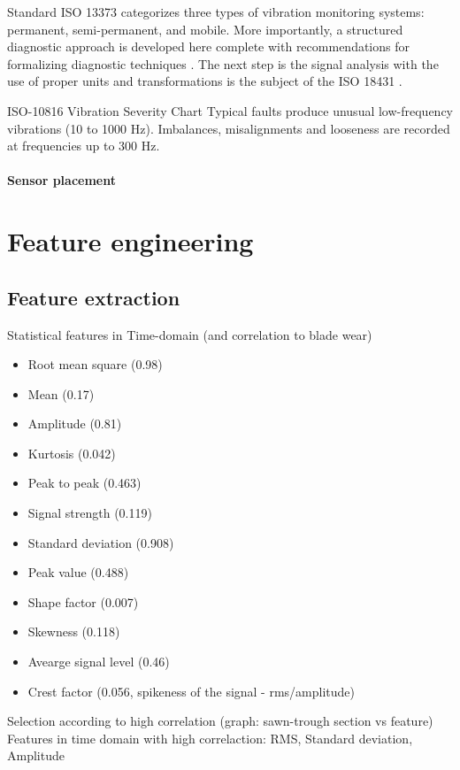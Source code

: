 Standard ISO 13373 categorizes three types of vibration monitoring systems: permanent, semi-permanent, and mobile. More importantly, a structured diagnostic approach is developed here complete with recommendations for formalizing diagnostic techniques \cite{iso_13373}. The next step is the signal analysis with the use of proper units and transformations is the subject of the ISO 18431 \cite{iso_18431}.

ISO-10816 Vibration Severity Chart
Typical faults produce unusual low-frequency vibrations (10 to 1000 Hz).
Imbalances, misalignments and looseness are recorded at frequencies up to 300 Hz.

\paragraph{Sensor placement}

\section{Feature engineering}
\subsection{Feature extraction}
Statistical features in Time-domain (and correlation to blade wear) \cite{zhuo_research_2022} \cite{zheng_feature_2018}
\begin{itemize}
	\item 	Root mean square (0.98)
	\item Mean (0.17)
	\item Amplitude (0.81)
	\item Kurtosis (0.042)
	\item Peak to peak (0.463)
	\item Signal strength (0.119)
	\item Standard deviation (0.908)
	\item Peak value (0.488)
	\item Shape factor (0.007)
	\item Skewness (0.118)
	\item Avearge signal level (0.46)
	\item Crest factor (0.056, spikeness of the signal - rms/amplitude)
\end{itemize}
Selection according to high correlation (graph: sawn-trough section vs feature)
Features in time domain with high correlaction: RMS, Standard deviation, Amplitude

